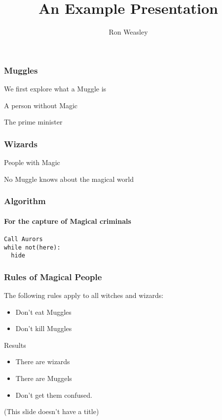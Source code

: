 \documentclass{beamer}
\title{An Example Presentation}
\author{Ron Weasley}
\institute{Liverpool}
\begin{document}
\begin{frame}
\maketitle
\end{frame}


 
\begin{frame}
\frametitle{Muggles}
We first explore what a Muggle is 

\begin{definition}[Muggle]
A person without Magic
\end{definition}


\begin{example}[Muggle]
The prime minister
\end{example}
\end{frame}

 
\begin{frame}
\frametitle{Wizards}
\begin{definition}[Wizards]
People with Magic
\end{definition} 

\pause
\begin{theorem}
No Muggle knows about the magical world
\end{theorem} 

\end{frame}


\begin{frame}[fragile]
\frametitle{Algorithm}
\framesubtitle{For the capture of Magical criminals}

\begin{lstlisting}[mathescape=true]
Call Aurors
while not(here):
  hide
\end{lstlisting}

\end{frame}


\begin{frame}
\frametitle{Rules of Magical People}

The following rules apply to all witches and wizards:
\begin{itemize}
\item Don't eat Muggles
\item Don't kill Muggles
\end{itemize}

\end{frame}



\begin{frame}[notitle]

\begin{block}{Results}
\begin{itemize}
  \item There are wizards
  \item There are Muggels
  \pause
  \item Don't get them confused.
\end{itemize}
\end{block}
{\small (This slide doesn't have a title)}

\end{frame}
 
\end{document}
